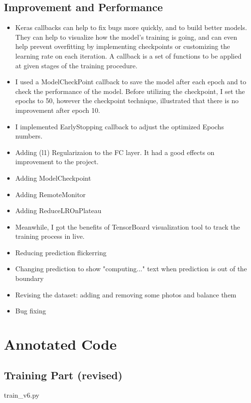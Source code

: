 \documentclass{article}
\begin{document}
\subsection{Improvement and Performance}
\begin{itemize}
    \item Keras callbacks can help to fix bugs more quickly, and to build better models. They can help to visualize how the model’s training is going, and can even help prevent overfitting by implementing checkpoints or customizing the learning rate on each iteration. A callback is a set of functions to be applied at given stages of the training procedure.
    \item I used a ModelCheckPoint callback to save the model after each epoch and to check the performance of the model. Before utilizing the checkpoint, I set the epochs to 50, however the checkpoint technique, illustrated that there is no improvement after epoch 10.
    \item I implemented EarlyStopping callback to adjust the optimized Epochs numbers.
    \item Adding (l1) Regularizaion to the FC layer. It had a good effects on improvement to the project.
    \item Adding ModelCheckpoint
    \item Adding RemoteMonitor
    \item Adding ReduceLROnPlateau
    \item Meanwhile, I got the benefits of TensorBoard visualization tool to track the training process in live.
    \item Reducing prediction flickerring
    \item Changing prediction to show "computing..." text when prediction is out of the boundary
    \item Revising the dataset: adding and removing some photos and balance them
    \item Bug fixing

\end{itemize}


\section{Annotated Code}
\subsection{Training Part (revised)}
{train_v6.py}
\end{document}
